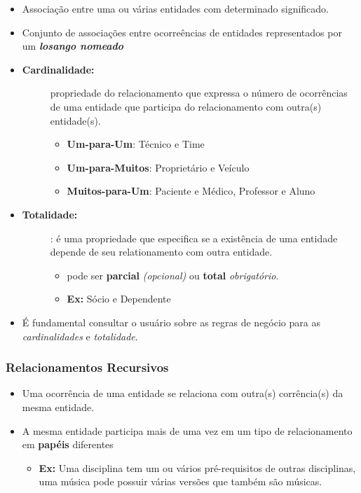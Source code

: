 \documentclass[12pt,a4paper]{article}
\begin{document}
\begin{itemize}
    \item
        Associação entre uma ou várias entidades com determinado significado.
    \item
        Conjunto de associações entre ocorreências de entidades representados por um \textit{\textbf{losango nomeado}}
    \item \begin{description}
            \item[\textbf{Cardinalidade:}] 
                propriedade do relacionamento que expressa o nú\-me\-ro de ocorrências de uma entidade que participa do relacionamento com outra(s) entidade(s).
                \begin{itemize}
                    \item \textbf{Um-para-Um}: Técnico e Time
                    \item \textbf{Um-para-Muitos}: Proprietário e Veículo
                    \item \textbf{Muitos-para-Um}: Paciente e Médico, Professor e Aluno
                \end{itemize}
     \end{description}
     \item \begin{description}
             \item[\textbf{Totalidade:}]: é uma propriedade que especifica se a existência de uma entidade depende de seu relationamento com outra entidade.
                 \begin{itemize}
                     \item pode ser \textbf{parcial} \textit{(opcional)} ou \textbf{total} \textit{obrigatório}.
                     \item \textbf{Ex:} Sócio e Dependente
                 \end{itemize}
         \end{description}
     \item É fundamental consultar o usuário sobre as regras de negócio para as \textit{cardinalidades} e \textit{totalidade}.
\end{itemize}

\newpage

\subsubsection{Relacionamentos Recursivos}
\begin{itemize}
    \item
        Uma ocorrência de uma entidade se relaciona com outra(s) corrência(s) da mesma entidade.
    \item 
        A mesma entidade participa mais de uma vez em um tipo de relacionamento em \textbf{papéis} diferentes
        \begin{itemize}
            \item
                \textbf{Ex:} Uma disciplina tem um ou vários pré-requisitos de outras disciplinas, uma música pode possuir várias versões que também são músicas.
        \end{itemize}
\end{itemize}
\end{document}
